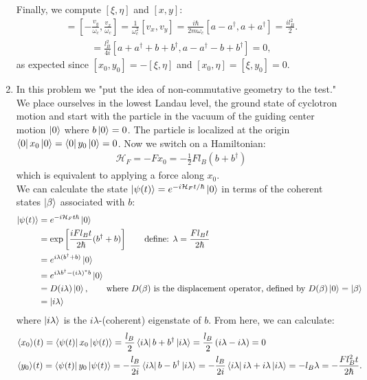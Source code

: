 \documentclass{article}
\theoremstyle{definition}
\newcommand{\ham}{\mathcal{H}}
\newcommand{\be}{\beta}
\newcommand{\f}[2]{\frac{#1}{#2}}
\newcommand{\lp}{\left(}
\newcommand{\rp}{\right)}
\newcommand{\lb}{\left[}
\newcommand{\rb}{\right]}
\begin{document}
\begin{enumerate}[label=\alph*)]
	\noindent Finally, we compute $[\xi,\eta]$ and $[x,y]$:
	\begin{align*}
	[\xi,\eta] = \lb -\f{v_y}{\omega_c}, \f{v_x}{\omega_c} \rb = \f{1}{\omega_c^2}[v_x,v_y] = \f{i\hbar }{2m\omega_c} [a-a^\dagger , a+a^\dagger] = \f{il_B^2}{2}.
	\end{align*}
	\begin{align*}
	[x,y] = \f{l_B^2}{4i} [a+a^\dagger + b+b^\dagger, a-a^\dagger - b + b^\dagger] = 0,
	\end{align*}
	as expected since $[x_0,y_0] = -[\xi,\eta]$ and $[x_0,\eta] = [\xi,y_0] = 0$. 
	
	\item In this problem we "put the idea of non-commutative geometry to the test." We place ourselves in the lowest Landau level, the ground state of cyclotron motion and start with the particle in the vacuum of the guiding center motion $\ket{0}$ where $b\ket{0} = 0$. The particle is localized at the origin $\bra{0} x_0 \ket{0} = \bra{0} y_0 \ket{0} = 0$. Now we switch on a Hamiltonian:
	\begin{align*}
		\ham_F = -F x_0 = -\f{1}{2} Fl_B (b+b^\dagger)
	\end{align*}
	which is equivalent to applying a force along $x_0$. \\
	
	We can calculate the state $\ket{\psi(t)} = e^{-i\ham_F t/\hbar}\ket{0}$ in terms of the coherent states $\ket{\be}$ associated with $b$:
	\begin{align*}
		\ket{\psi(t)} 
		&= e^{-i\ham_F t\hbar} \ket{0} \\ 
		&= \exp\lb \f{iFl_B t}{2\hbar} (b^\dagger + b) \rb \quad\quad \text{define:  } \lambda = \f{Fl_B t}{2\hbar} \\
		&= e^{i\lambda(b^\dagger + b)} \ket{0}\\
		&= e^{i\lambda b^\dagger - (i\lambda)^* b} \ket{0} \\
		&= D(i\lambda) \ket{0}, \quad\quad \text{where $D(\be)$ is the displacement operator, defined by $D(\be)\ket{0} = \ket{\be}$} \\
		&= \ket{i\lambda}
	\end{align*}
	where $\ket{i\lambda}$ is the $i\lambda$-(coherent) eigenstate of $b$. From here, we can calculate:
	\begin{align*}
		&\langle x_0 \rangle (t) = \bra{\psi(t)} x_0 \ket{\psi(t)} = \f{l_B}{2}\bra{i\lambda} b+b^\dagger \ket{i\lambda} = \f{l_B}{2}\lp i\lambda - i\lambda \rp = 0\\
		&\langle y_0 \rangle (t) = \bra{\psi(t)} y_0 \ket{\psi(t)} = -\f{l_B}{2i}\bra{i\lambda} b -b^\dagger \ket{i\lambda} = -\f{l_B}{2i} \bra{i\lambda} i\lambda + i\lambda \ket{i\lambda} = -l_B\lambda = -\f{F l_B^2 t }{2\hbar}.
	\end{align*}
\end{enumerate}
\end{document}

